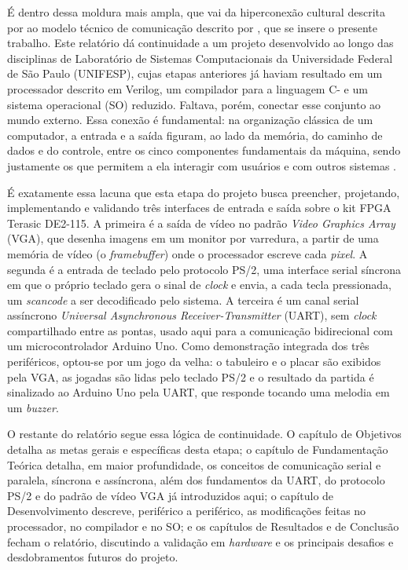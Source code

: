 \documentclass[
	12pt,
	oneside,
	a4paper,
	english,
	french,
	spanish,
	brazil,
	]{abntex2}
\begin{document}
É dentro dessa moldura mais ampla, que vai da hiperconexão cultural descrita por  ao modelo técnico de comunicação descrito por , que se insere o presente trabalho. Este relatório dá continuidade a um projeto desenvolvido ao longo das disciplinas de Laboratório de Sistemas Computacionais da Universidade Federal de São Paulo (UNIFESP), cujas etapas anteriores já haviam resultado em um processador descrito em Verilog, um compilador para a linguagem C- e um sistema operacional (SO) reduzido. Faltava, porém, conectar esse conjunto ao mundo externo. Essa conexão é fundamental: na organização clássica de um computador, a entrada e a saída figuram, ao lado da memória, do caminho de dados e do controle, entre os cinco componentes fundamentais da máquina, sendo justamente os que permitem a ela interagir com usuários e com outros sistemas \cite{patterson2017}.

É exatamente essa lacuna que esta etapa do projeto busca preencher, projetando, implementando e validando três interfaces de entrada e saída sobre o kit FPGA Terasic DE2-115. A primeira é a saída de vídeo no padrão \emph{Video Graphics Array} (VGA), que desenha imagens em um monitor por varredura, a partir de uma memória de vídeo (o \emph{framebuffer}) onde o processador escreve cada \emph{pixel}. A segunda é a entrada de teclado pelo protocolo PS/2, uma interface serial síncrona em que o próprio teclado gera o sinal de \emph{clock} e envia, a cada tecla pressionada, um \emph{scancode} a ser decodificado pelo sistema. A terceira é um canal serial assíncrono \emph{Universal Asynchronous Receiver-Transmitter} (UART), sem \emph{clock} compartilhado entre as pontas, usado aqui para a comunicação bidirecional com um microcontrolador Arduino Uno. Como demonstração integrada dos três periféricos, optou-se por um jogo da velha: o tabuleiro e o placar são exibidos pela VGA, as jogadas são lidas pelo teclado PS/2 e o resultado da partida é sinalizado ao Arduino Uno pela UART, que responde tocando uma melodia em um \emph{buzzer}.

O restante do relatório segue essa lógica de continuidade. O capítulo de Objetivos detalha as metas gerais e específicas desta etapa; o capítulo de Fundamentação Teórica detalha, em maior profundidade, os conceitos de comunicação serial e paralela, síncrona e assíncrona, além dos fundamentos da UART, do protocolo PS/2 e do padrão de vídeo VGA já introduzidos aqui; o capítulo de Desenvolvimento descreve, periférico a periférico, as modificações feitas no processador, no compilador e no SO; e os capítulos de Resultados e de Conclusão fecham o relatório, discutindo a validação em \emph{hardware} e os principais desafios e desdobramentos futuros do projeto.
\end{document}

